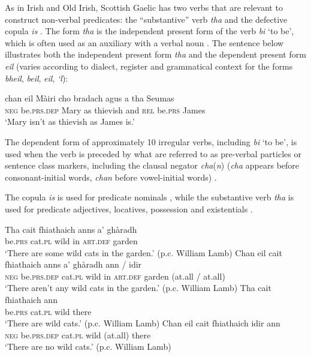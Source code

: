 ﻿\documentclass[output=paper]{langsci/langscibook}
\begin{document}
\begin{unindented}
As in Irish and Old Irish, Scottish Gaelic has two verbs that are relevant
to construct non-verbal predicates: the ``substantive'' verb \textit{tha} and the defective copula \textit{is} \citep[65]{Lamb2001}. The form \textit{tha} is the independent present form of the verb \textit{bi} `to be', which is often used as an auxiliary with a verbal noun \citep[54]{Lamb2001}. The sentence below illustrates both the independent present form \textit{tha} and the dependent present form \textit{eil} (varies according to dialect, register and grammatical context for the forms \textit{bheil}, \textit{beil}, \textit{eil}, \textit{‘l}): 
%
\begin{exe}\ex \gll chan eil Màiri cho bradach agus a tha Seumas \\
\textsc{neg}  be.\textsc{prs.dep} Mary  as    thievish and   \textsc{rel} be.\textsc{prs} James \\
    \glt `Mary isn't as thievish as James is.' \citep[42]{Lamb2001}
    \end{exe}

The dependent form of approximately 10 irregular verbs, including
\textit{bi} `to be', is used when the verb is preceded by what are referred
to as pre-verbal particles or sentence class markers, including the clausal
negator \textit{cha}(\textit{n}) (\textit{cha} appears before consonant-initial words, \textit{chan} before vowel-initial words) \citep[48--50]{Lamb2001}.

The copula \textit{is} is used for predicate nominals \citep[66--67]{Lamb2001}, while the substantive verb \textit{tha} is used for predicate adjectives, locatives, possession and existentials \citep[67--69]{Lamb2001}.
%
\begin{exe}\ex \gll Tha cait fhiathaich anns a’ ghàradh \\
be.\textsc{prs} cat.\textsc{pl} wild in \textsc{art.def} garden \\
    \glt `There are some wild cats in the garden.' (p.c. William Lamb)
\ex\label{ex:ieur-app-gaelic-nocatsingarden} \gll Chan eil cait fhiathaich anns a’ ghàradh {\op}ann / idir{\cp} \\
\textsc{neg}    be.\textsc{prs}.\textsc{dep} cat.\textsc{pl} wild          in     \textsc{art}.\textsc{def} garden (at.all / at.all) \\
    \glt `There aren't any wild cats in the garden.' (p.c. William Lamb)
\ex\label{ex:ieur-app-gaelic-yescatplease} 
\gll Tha cait fhiathaich ann \\
        be.\textsc{prs} cat.\textsc{pl}  wild there \\
    \glt `There are wild cats.' (p.c. William Lamb)
\ex\label{ex:ieur-app-gaelic-nocatsnow} \gll Chan  eil cait fhiathaich {\op}idir{\cp}    ann \\
\textsc{neg}    be.\textsc{prs.dep}  cat.\textsc{pl} wild           (at.all) there \\
    \glt `There are no wild cats.' (p.c. William Lamb)
\end{exe}


\end{unindented}
\end{document}
